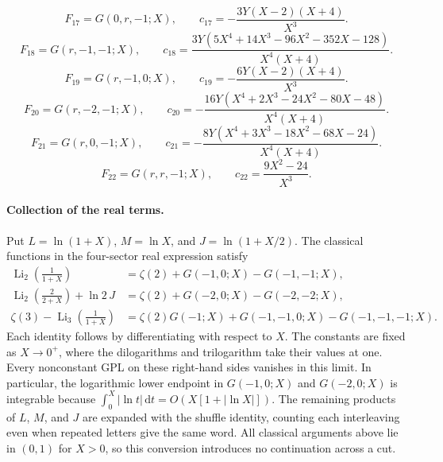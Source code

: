 \begin{equation}
 F_{17}=G(0,r,-1;X),\qquad c_{17}=- \frac{3 Y \left(X - 2\right) \left(X + 4\right)}{X^{3}}.
\end{equation}
\begin{equation}
 F_{18}=G(r,-1,-1;X),\qquad c_{18}=\frac{3 Y \left(5 X^{4} + 14 X^{3} - 96 X^{2} - 352 X - 128\right)}{X^{4} \left(X + 4\right)}.
\end{equation}
\begin{equation}
 F_{19}=G(r,-1,0;X),\qquad c_{19}=- \frac{6 Y \left(X - 2\right) \left(X + 4\right)}{X^{3}}.
\end{equation}
\begin{equation}
 F_{20}=G(r,-2,-1;X),\qquad c_{20}=- \frac{16 Y \left(X^{4} + 2 X^{3} - 24 X^{2} - 80 X - 48\right)}{X^{4} \left(X + 4\right)}.
\end{equation}
\begin{equation}
 F_{21}=G(r,0,-1;X),\qquad c_{21}=- \frac{8 Y \left(X^{4} + 3 X^{3} - 18 X^{2} - 68 X - 24\right)}{X^{4} \left(X + 4\right)}.
\end{equation}
\begin{equation}
 F_{22}=G(r,r,-1;X),\qquad c_{22}=\frac{9 X^{2} - 24}{X^{3}}.
\end{equation}
\paragraph{Collection of the real terms.} Put $L=\ln(1+X)$, $M=\ln X$, and $J=\ln(1+X/2)$. The classical functions in the four-sector real expression satisfy
\begin{align}
\operatorname{Li}_2\!\left(\frac1{1+X}\right)&=\zeta(2)+G(-1,0;X)-G(-1,-1;X),\\
\operatorname{Li}_2\!\left(\frac2{2+X}\right)+\ln2\,J&=\zeta(2)+G(-2,0;X)-G(-2,-2;X),\\
\zeta(3)-\operatorname{Li}_3\!\left(\frac1{1+X}\right)&=\zeta(2)G(-1;X)+G(-1,-1,0;X)-G(-1,-1,-1;X).
\end{align}
Each identity follows by differentiating with respect to $X$. The constants are fixed as $X\to0^+$, where the dilogarithms and trilogarithm take their values at one. Every nonconstant GPL on these right-hand sides vanishes in this limit. In particular, the logarithmic lower endpoint in $G(-1,0;X)$ and $G(-2,0;X)$ is integrable because $\int_0^X|\ln t|\,\mathrm{d}t=O(X[1+|\ln X|])$. The remaining products of $L$, $M$, and $J$ are expanded with the shuffle identity, counting each interleaving even when repeated letters give the same word. All classical arguments above lie in $(0,1)$ for $X>0$, so this conversion introduces no continuation across a cut.
